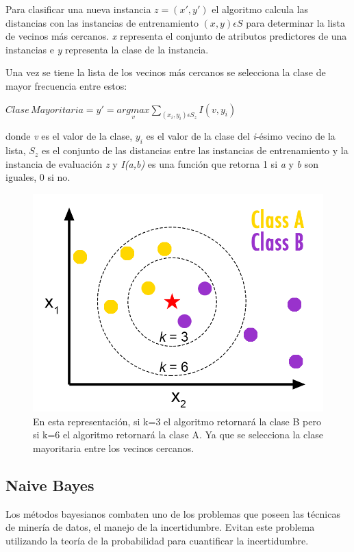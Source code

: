 Para clasificar una nueva instancia $z=(x',y')$ el algoritmo calcula
las distancias con las instancias de entrenamiento $(x,y)\epsilon S$
para determinar la lista de vecinos más cercanos. \emph{x} representa
el conjunto de atributos predictores de una instancias e \emph{y} representa
la clase de la instancia.

Una vez se tiene la lista de los vecinos más cercanos se selecciona
la clase de mayor frecuencia entre estos:
\begin{center}
$Clase\, Mayoritaria=y'=\underset{v}{argmax}\underset{(x_{i},y_{i})\epsilon S_{z}}{\sum}I(v,y_{i})$
\end{center}

donde \emph{v} es el valor de la clase, $y_{i}$ es el valor de la
clase del \emph{i}-ésimo vecino de la lista, $S_{z}$ es el conjunto
de las distancias entre las instancias de entrenamiento y la instancia
de evaluación \emph{z} y \emph{I(a,b)} es una función que retorna
1 si \emph{a} y \emph{b} son iguales, 0 si no\cite{key-300, key-180}.
\begin{figure}[H]
\begin{centering}
\includegraphics[scale=0.6]{knn}
\par\end{centering}
\caption{En esta representación, si k=3 el algoritmo retornará la clase B pero si k=6 el algoritmo retornará la clase A. Ya que se selecciona la clase mayoritaria entre los vecinos cercanos.}
\end{figure}
\subsection{Naive Bayes}
Los métodos bayesianos combaten uno de los problemas que poseen las técnicas de minería de datos, el manejo de la incertidumbre. Evitan este problema utilizando la teoría de la probabilidad para cuantificar la incertidumbre.

